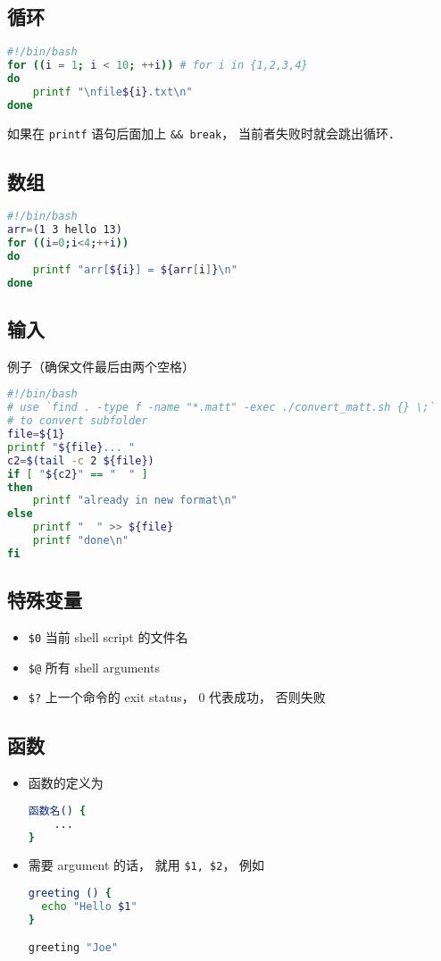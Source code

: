 \subsection{循环}
\begin{lstlisting}[language=bash]
#!/bin/bash
for ((i = 1; i < 10; ++i)) # for i in {1,2,3,4}
do
	printf "\nfile${i}.txt\n"
done
\end{lstlisting}
如果在 \verb|printf| 语句后面加上 \verb|&& break|， 当前者失败时就会跳出循环．

\subsection{数组}
\begin{lstlisting}[language=bash]
#!/bin/bash
arr=(1 3 hello 13)
for ((i=0;i<4;++i))
do
    printf "arr[${i}] = ${arr[i]}\n"
done
\end{lstlisting}


\subsection{输入}
例子（确保文件最后由两个空格）

\begin{lstlisting}[language=bash]
#!/bin/bash
# use `find . -type f -name "*.matt" -exec ./convert_matt.sh {} \;`
# to convert subfolder
file=${1}
printf "${file}... "
c2=$(tail -c 2 ${file})
if [ "${c2}" == "  " ]
then
	printf "already in new format\n"
else
	printf "  " >> ${file}
	printf "done\n"
fi
\end{lstlisting}

\subsection{特殊变量}
\begin{itemize}
\item \verb`$0` 当前 shell script 的文件名
\item \verb`$@` 所有 shell arguments
\item \verb|$?| 上一个命令的 exit status， 0 代表成功， 否则失败
\end{itemize}

\subsection{函数}

\begin{itemize}
\item 函数的定义为
\begin{lstlisting}[language=bash]
函数名() {
	...
}
\end{lstlisting}
\item 需要 argument 的话， 就用 \verb|$1, $2|， 例如
\begin{lstlisting}[language=bash]
greeting () {
  echo "Hello $1"
}

greeting "Joe"
\end{lstlisting}
\end{itemize}
